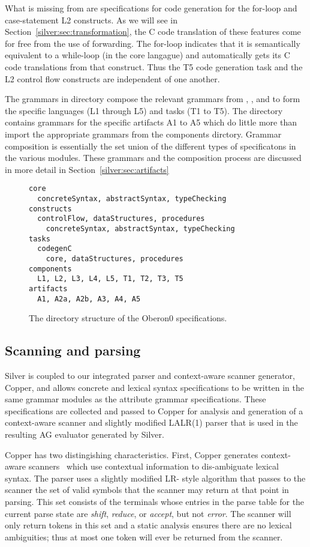 What is missing from  are specifications for code
generation for the for-loop and case-statement L2 constructs.  As we
will see in Section~\ref{silver:sec:transformation}, the C code
translation of these features come for free from the use of
forwarding.  The for-loop indicates that it is semantically equivalent
to a while-loop (in the core langague) and automatically gets its C
code translations from that construct.  Thus the T5 code generation task
and the L2 control flow constructs are independent of one another.

The grammars in  directory compose the relevant
grammars from , , and  to form
the specific languages (L1 through L5) and tasks (T1 to T5).  The
 directory contains grammars for the specific
artifacts A1 to A5 which do little more than import the appropriate
grammars from the components dirctory.  
%
Grammar composition is essentially the set union of the different
types of specificatons in the various modules.
%
These grammars and the composition process are discussed in more
detail in Section~\ref{silver:sec:artifacts}

\begin{figure}
\begin{verbatim}
core
  concreteSyntax, abstractSyntax, typeChecking
constructs
  controlFlow, dataStructures, procedures  
    concreteSyntax, abstractSyntax, typeChecking
tasks
  codegenC
    core, dataStructures, procedures
components
  L1, L2, L3, L4, L5, T1, T2, T3, T5
artifacts
  A1, A2a, A2b, A3, A4, A5
\end{verbatim}
\caption{The directory structure of the Oberon0 specifications.}
\label{silver:fig:structure}
\end{figure}

\subsection{Scanning and parsing}

Silver is coupled to our integrated parser and context-aware scanner
generator, Copper, and allows concrete and lexical syntax
specifications to be written in the same grammar modules as the
attribute grammar specifications.  These specifications are collected
and passed to Copper for analysis and generation of a context-aware
scanner and slightly modified LALR(1) parser that is used in the
resulting AG evaluator generated by Silver.

Copper has two distingishing characteristics.  First, Copper generates
context-aware scanners~\cite{vanwyk07gpce} which use contextual
information to dis-ambiguate lexical syntax.
%
The parser uses a slightly modified LR- style algorithm that passes to
the scanner the set of valid symbols that the scanner may return at
that point in parsing. This set consists of the terminals whose
entries in the parse table for the current parse state are
\emph{shift}, \emph{reduce}, or \emph{accept}, but not \emph{error}.
The scanner will only return tokens in this set and a static analysis
ensures there are no lexical ambiguities; thus at most one token will
ever be returned from the scanner.

